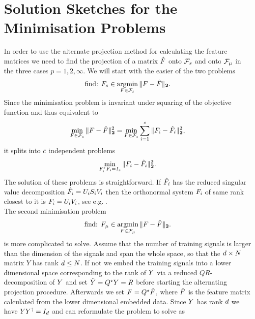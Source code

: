 \documentclass[11pt]{article}
\begin{document}
\appendix
\section{Solution Sketches for the Minimisation Problems}
In order to use the alternate projection method for calculating the feature matrices we need to find the projection of a matrix $\hat{{F}}$ onto $\mathcal{{F}}_s$ and onto $\mathcal{{F}}_\mu$ in the three cases $p=1,2,\infty$.
We will start with the easier of the two problems
\begin{align}
\mbox{find: } {F}_s\in \operatorname*{argmin}_{{F} \in \mathcal{{F}}_s } \|{F}-\hat{{F}}\|_{\mathbf{2}}.
\end{align}
Since the minimisation problem is invariant under squaring of the objective function and thus equivalent to
\begin{align}
\min_{{F} \in \mathcal{{F}}_s } \|{F}-\hat{{F}}\|^2_{\mathbf{2}}=
\min_{{F} \in \mathcal{{F}}_s } \sum_{i=1}^{c} \|{F}_i-\hat{{F}}_i\|^2_{\mathbf{2}},
\end{align}
it splits into ${c}$ independent problems
\begin{align}
\min_{{F}_i^\star{F}_i = I_{{s}} } \|{F}_i-\hat{{F}}_i\|^2_{\mathbf{2}}.
\end{align}
The solution of these problems is straightforward. If $\hat{{F}}_i$ has the reduced singular value decomposition $\hat{{F}}_i= U_iS_iV_i$ then the orthonormal system ${F}_i$ of same rank closest to it is ${F}_i=U_iV_i$, see e.g. \cite{horn_johnson}.\\
The second minimisation problem
\begin{align}
\mbox{find: } {F}_\mu\in \operatorname*{argmin}_{{F} \in \mathcal{{F}}_\mu } \|{F}-\hat{{F}}\|_{\mathbf{2}}. \notag
\end{align}
is more complicated to solve. Assume that the number of training signals is larger than the dimension of the signals and span the whole space, so that the ${d}\times {N}$ matrix $Y$ has rank ${d} \leq {N}$. If not we embed the training signals into a lower dimensional space corresponding to the rank of ${Y}$ via a reduced $QR$-decomposition of ${Y}$ and set $\tilde{{Y}}=Q^\star {Y}=R$ before starting the alternating projection procedure. Afterwards we set ${F}=Q^\star \tilde{{F}}$, where $\tilde{{F}}$ is the feature matrix calculated from the lower dimensional embedded data.
Since ${Y}$ has rank ${d}$ we have ${Y} {Y}^\dagger = I_d$ and can reformulate the problem to solve as
\end{document}
